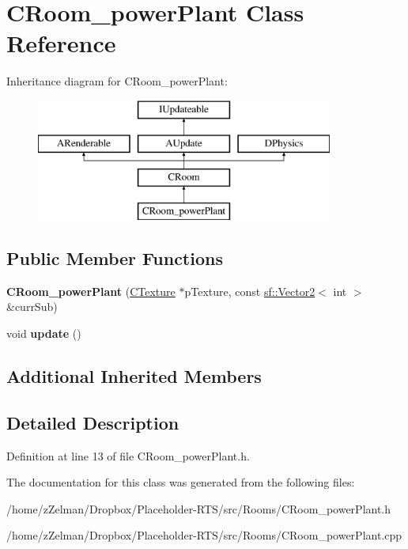 \hypertarget{classCRoom__powerPlant}{\section{C\-Room\-\_\-power\-Plant Class Reference}
\label{classCRoom__powerPlant}
}
Inheritance diagram for C\-Room\-\_\-power\-Plant\-:\begin{figure}[H]
\begin{center}
\leavevmode
\includegraphics[height=4.000000cm]{classCRoom__powerPlant}
\end{center}
\end{figure}
\subsection*{Public Member Functions}
\begin{DoxyCompactItemize}
\item 
\hypertarget{classCRoom__powerPlant_af7d6452c5f0b7bc4b0050ea7765bc223}{{\bfseries C\-Room\-\_\-power\-Plant} (\hyperlink{classCTexture}{C\-Texture} $\ast$p\-Texture, const \hyperlink{classsf_1_1Vector2}{sf\-::\-Vector2}$<$ int $>$ \&curr\-Sub)}\label{classCRoom__powerPlant_af7d6452c5f0b7bc4b0050ea7765bc223}

\item 
\hypertarget{classCRoom__powerPlant_a8861ab0e2382e25b0130b29326717121}{void {\bfseries update} ()}\label{classCRoom__powerPlant_a8861ab0e2382e25b0130b29326717121}

\end{DoxyCompactItemize}
\subsection*{Additional Inherited Members}


\subsection{Detailed Description}


Definition at line 13 of file C\-Room\-\_\-power\-Plant.\-h.



The documentation for this class was generated from the following files\-:\begin{DoxyCompactItemize}
\item 
/home/z\-Zelman/\-Dropbox/\-Placeholder-\/\-R\-T\-S/src/\-Rooms/C\-Room\-\_\-power\-Plant.\-h\item 
/home/z\-Zelman/\-Dropbox/\-Placeholder-\/\-R\-T\-S/src/\-Rooms/C\-Room\-\_\-power\-Plant.\-cpp\end{DoxyCompactItemize}
